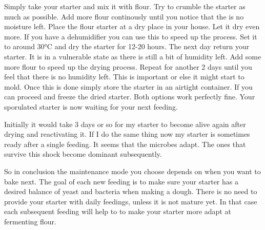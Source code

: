 Simply take your starter and mix it with flour. Try to crumble the starter as
much as possible. Add more flour continously until you notice that the is no
moisture left. Place the flour starter at a dry place in your house. Let it
dry even more. If you have a dehumidifier you can use this to speed up the
process. Set it to around 30°C and dry the starter for 12-20 hours. The next
day return your starter. It is in a vulnerable state as there is still a bit
of humidity left. Add some more flour to speed up the drying process. Repeat
for another 2 days until you feel that there is no humidity left. This is
important or else it might start to mold. Once this is done simply store the
starter in an airtight container. If you can proceed and freeze
the dried starter. Both options work perfectly fine. Your sporulated starter
is now waiting for your next feeding.

Initially it would take 3 days or so for my starter to become alive again
after drying and reactivating it. If I do the same thing now my starter is
sometimes ready after a single feeding. It seems that the microbes adapt. The ones
that survive this shock become dominant subsequently.

So in conclusion the maintenance mode you choose depends on when you want to bake next.
The goal of each new feeding is to make sure your starter
has a desired balance of yeast and bacteria when making a dough. There is no need to provide your
starter with daily feedings, unless it is not mature yet. In that case each
subsequent feeding will help to to make your starter more adapt at fermenting
flour.

